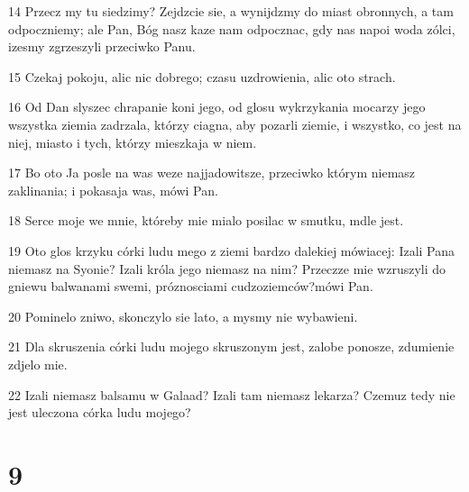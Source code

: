 \par 14 Przecz my tu siedzimy? Zejdzcie sie, a wynijdzmy do miast obronnych, a tam odpoczniemy; ale Pan, Bóg nasz kaze nam odpocznac, gdy nas napoi woda zólci, izesmy zgrzeszyli przeciwko Panu.
\par 15 Czekaj pokoju, alic nic dobrego; czasu uzdrowienia, alic oto strach.
\par 16 Od Dan slyszec chrapanie koni jego, od glosu wykrzykania mocarzy jego wszystka ziemia zadrzala, którzy ciagna, aby pozarli ziemie, i wszystko, co jest na niej, miasto i tych, którzy mieszkaja w niem.
\par 17 Bo oto Ja posle na was weze najjadowitsze, przeciwko którym niemasz zaklinania; i pokasaja was, mówi Pan.
\par 18 Serce moje we mnie, któreby mie mialo posilac w smutku, mdle jest.
\par 19 Oto glos krzyku córki ludu mego z ziemi bardzo dalekiej mówiacej: Izali Pana niemasz na Syonie? Izali króla jego niemasz na nim? Przeczze mie wzruszyli do gniewu balwanami swemi, próznosciami cudzoziemców?mówi Pan.
\par 20 Pominelo zniwo, skonczylo sie lato, a mysmy nie wybawieni.
\par 21 Dla skruszenia córki ludu mojego skruszonym jest, zalobe ponosze, zdumienie zdjelo mie.
\par 22 Izali niemasz balsamu w Galaad? Izali tam niemasz lekarza? Czemuz tedy nie jest uleczona córka ludu mojego?

\chapter{9}

